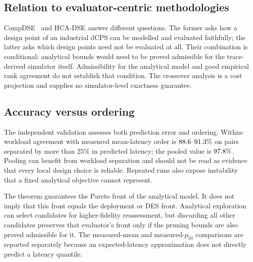 \subsection{Relation to evaluator-centric methodologies}
CompDSE~\cite{saadatmand2025compdse} and HCA-DSE answer different questions. The former
asks how a design point of an industrial dCPS can be modelled and evaluated faithfully;
the latter asks which design points need not be evaluated at all. Their combination is
conditional: analytical bounds would need to be proved admissible for the
trace-derived simulator itself. Admissibility for the analytical model and good
empirical rank agreement do not establish that condition. The crossover analysis
is a cost projection and supplies no simulator-level exactness guarantee.

\subsection{Accuracy versus ordering}
The independent validation assesses both prediction error and ordering. Within-workload
agreement with measured mean-latency order is $88.6\text{--}91.3\%$ on pairs
separated by more than $25\%$ in predicted latency; the pooled value is
$97.8\%$. Pooling can benefit from workload separation and should not be
read as evidence that every local design choice is reliable. Repeated runs also expose
instability that a fixed analytical objective cannot represent.

The theorem guarantees the Pareto front of the analytical model. It does not imply that
this front equals the deployment or DES front. Analytical exploration can select
candidates for higher-fidelity reassessment, but discarding all other candidates preserves
that evaluator's front only if the pruning bounds are also proved admissible for it.
The measured-mean and measured-$p_{50}$ comparisons are reported separately because
an expected-latency approximation does not directly predict a latency quantile.
